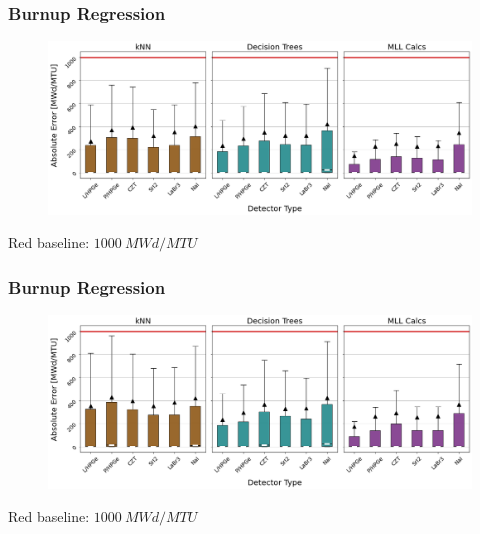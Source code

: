 \begin{frame}
  \frametitle{Burnup Regression}
  \begin{adjustwidth}{-15pt}{-10pt}
  \begin{figure}
    \centering
    \includegraphics[width=1.1\textwidth]{./figures/abserror_boxplots_short_burn.png}
  \end{figure}
  \vspace{12pt} \centering Red baseline: $1000\:MWd/MTU$
  \end{adjustwidth}
\end{frame}

\begin{frame}
  \frametitle{Burnup Regression}
  \begin{adjustwidth}{-15pt}{-10pt}
  \begin{figure}
    \centering
    \includegraphics[width=1.1\textwidth]{./figures/abserror_boxplots_long_burn.png}
  \end{figure}
  \vspace{12pt} \centering Red baseline: $1000\:MWd/MTU$
  \end{adjustwidth}
\end{frame}


